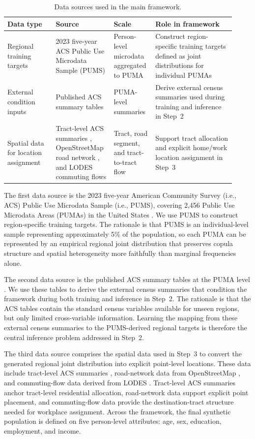 \documentclass[11pt]{article}
\begin{document}
\begin{table}[!bhtp]
\centering
\small
\caption{Data sources used in the main framework.}
\label{tab:data}
\begin{tabular}{p{0.20\linewidth}p{0.23\linewidth}p{0.16\linewidth}p{0.33\linewidth}}
\toprule
Data type & Source & Scale & Role in framework \\
\midrule
Regional training targets & 2023 five-year ACS Public Use Microdata Sample (PUMS) \cite{acs,pums} & Person-level microdata aggregated to PUMA & Construct region-specific training targets defined as joint distributions for individual PUMAs \\
External condition inputs & Published ACS summary tables \cite{acs} & PUMA-level summaries & Derive external census summaries used during training and inference in Step~2 \\
Spatial data for location assignment & Tract-level ACS summaries \cite{acs}, OpenStreetMap road network \cite{openstreetmap}, and LODES commuting flows \cite{lodes} & Tract, road segment, and tract-to-tract flow & Support tract allocation and explicit home/work location assignment in Step~3 \\
\bottomrule
\end{tabular}
\end{table}

The first data source is the 2023 five-year American Community Survey (i.e., ACS) Public Use Microdata Sample (i.e., PUMS), covering 2,456 Public Use Microdata Areas (PUMAs) in the United States \cite{acs,pums}. We use PUMS to construct region-specific training targets. The rationale is that PUMS is an individual-level sample representing approximately 5\% of the population, so each PUMA can be represented by an empirical regional joint distribution that preserves copula structure and spatial heterogeneity more faithfully than marginal frequencies alone.

The second data source is the published ACS summary tables at the PUMA level \cite{acs}. We use these tables to derive the external census summaries that condition the framework during both training and inference in Step~2. The rationale is that the ACS tables contain the standard census variables available for unseen regions, but only limited cross-variable information. Learning the mapping from these external census summaries to the PUMS-derived regional targets is therefore the central inference problem addressed in Step~2.

The third data source comprises the spatial data used in Step~3 to convert the generated regional joint distribution into explicit point-level locations. These data include tract-level ACS summaries \cite{acs}, road-network data from OpenStreetMap \cite{openstreetmap}, and commuting-flow data derived from LODES \cite{lodes}. Tract-level ACS summaries anchor tract-level residential allocation, road-network data support explicit point placement, and commuting-flow data provide the destination-tract structure needed for workplace assignment. Across the framework, the final synthetic population is defined on five person-level attributes: age, sex, education, employment, and income. 
\end{document}
